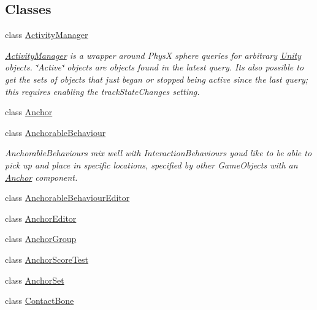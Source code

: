\subsection*{Classes}
\begin{DoxyCompactItemize}
\item 
class \mbox{\hyperlink{class_leap_1_1_unity_1_1_interaction_1_1_activity_manager}{Activity\+Manager}}
\begin{DoxyCompactList}\small\item\em \mbox{\hyperlink{class_leap_1_1_unity_1_1_interaction_1_1_activity_manager}{Activity\+Manager}} is a wrapper around PhysX sphere queries for arbitrary \mbox{\hyperlink{namespace_leap_1_1_unity}{Unity}} objects. \char`\"{}\+Active\char`\"{} objects are objects found in the latest query. It\textquotesingle{}s also possible to get the sets of objects that just began or stopped being active since the last query; this requires enabling the track\+State\+Changes setting. \end{DoxyCompactList}\item 
class \mbox{\hyperlink{class_leap_1_1_unity_1_1_interaction_1_1_anchor}{Anchor}}
\item 
class \mbox{\hyperlink{class_leap_1_1_unity_1_1_interaction_1_1_anchorable_behaviour}{Anchorable\+Behaviour}}
\begin{DoxyCompactList}\small\item\em Anchorable\+Behaviours mix well with Interaction\+Behaviours you\textquotesingle{}d like to be able to pick up and place in specific locations, specified by other Game\+Objects with an \mbox{\hyperlink{class_leap_1_1_unity_1_1_interaction_1_1_anchor}{Anchor}} component. \end{DoxyCompactList}\item 
class \mbox{\hyperlink{class_leap_1_1_unity_1_1_interaction_1_1_anchorable_behaviour_editor}{Anchorable\+Behaviour\+Editor}}
\item 
class \mbox{\hyperlink{class_leap_1_1_unity_1_1_interaction_1_1_anchor_editor}{Anchor\+Editor}}
\item 
class \mbox{\hyperlink{class_leap_1_1_unity_1_1_interaction_1_1_anchor_group}{Anchor\+Group}}
\item 
class \mbox{\hyperlink{class_leap_1_1_unity_1_1_interaction_1_1_anchor_score_test}{Anchor\+Score\+Test}}
\item 
class \mbox{\hyperlink{class_leap_1_1_unity_1_1_interaction_1_1_anchor_set}{Anchor\+Set}}
\item 
class \mbox{\hyperlink{class_leap_1_1_unity_1_1_interaction_1_1_contact_bone}{Contact\+Bone}}

\end{DoxyCompactItemize}
